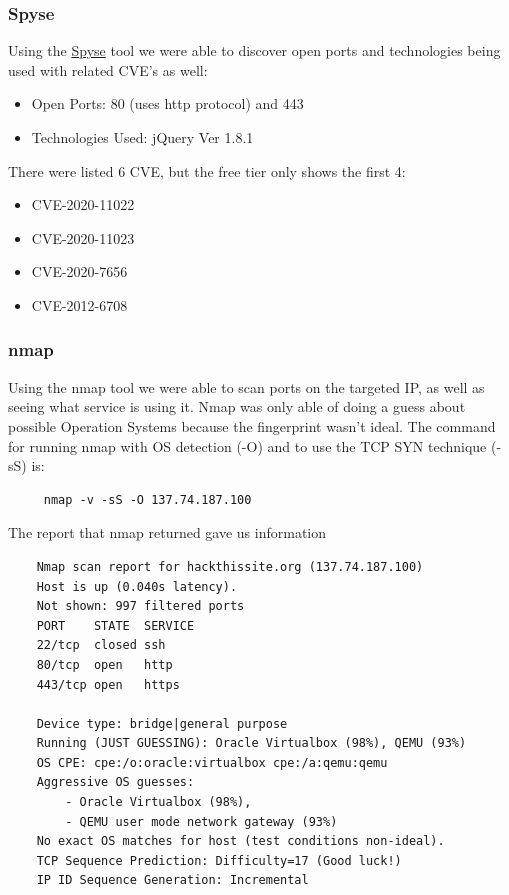 \subsubsection{Spyse}

Using the \href{https://spyse.com/target/ip/137.74.187.100}{Spyse} tool we were able to discover open ports and technologies being used with related CVE's as well: 
 
 \begin{itemize}
    \item Open Ports: 80 (uses http protocol) and 443
    \item Technologies Used: jQuery Ver 1.8.1
 \end{itemize}
 
 There were listed 6 CVE, but the free tier only shows the first 4:
 \begin{itemize}
    \item CVE-2020-11022
    \item CVE-2020-11023
    \item CVE-2020-7656
    \item CVE-2012-6708
 \end{itemize}
 
 \subsubsection{nmap}

Using the nmap tool we were able to scan ports on the targeted IP, as well as seeing what service is using it. Nmap was only able of doing a guess about possible Operation Systems because the fingerprint wasn't ideal. The command for running nmap with OS detection (-O) and to use the TCP SYN technique (-sS) is:

\begin{lstlisting}
     nmap -v -sS -O 137.74.187.100
\end{lstlisting}

The report that nmap returned gave us information

\begin{lstlisting}
    Nmap scan report for hackthissite.org (137.74.187.100)
    Host is up (0.040s latency).
    Not shown: 997 filtered ports
    PORT    STATE  SERVICE
    22/tcp  closed ssh
    80/tcp  open   http
    443/tcp open   https

    Device type: bridge|general purpose
    Running (JUST GUESSING): Oracle Virtualbox (98%), QEMU (93%)
    OS CPE: cpe:/o:oracle:virtualbox cpe:/a:qemu:qemu
    Aggressive OS guesses: 
        - Oracle Virtualbox (98%), 
        - QEMU user mode network gateway (93%)
    No exact OS matches for host (test conditions non-ideal).
    TCP Sequence Prediction: Difficulty=17 (Good luck!)
    IP ID Sequence Generation: Incremental

\end{lstlisting}
 
